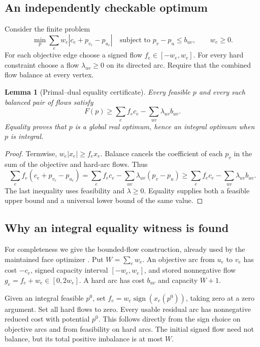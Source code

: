 \documentclass[11pt,letterpaper]{article}
\newtheorem{lemma}[theorem]{Lemma}
\theoremstyle{definition}
\begin{document}
\subsection{An independently checkable optimum}
Consider the finite problem
\begin{equation}\label{eq:networkprimal}
 \min_p\sum_e w_e|c_e+p_{v_e}-p_{u_e}|
 \quad\text{subject to }p_v-p_u\leq b_{uv},\qquad w_e\geq0.
\end{equation}
For each objective edge choose a signed flow $f_e\in[-w_e,w_e]$. For every hard constraint choose a flow $\lambda_{uv}\geq0$ on its directed arc. Require that the combined flow balance at every vertex.

\begin{lemma}[Primal--dual equality certificate]\label{lem:dual}
Every feasible $p$ and every such balanced pair of flows satisfy
\begin{equation}\label{eq:weakdual}
 F(p)\geq \sum_e f_ec_e-\sum_{uv}\lambda_{uv}b_{uv}.
\end{equation}
Equality proves that $p$ is a global real optimum, hence an integral optimum when $p$ is integral.
\end{lemma}
\begin{proof}
Termwise, $w_e|x_e|\geq f_ex_e$. Balance cancels the coefficient of each $p_v$ in the sum of the objective and hard-arc flows. Thus
\[
 \sum_e f_e(c_e+p_{v_e}-p_{u_e})
 =\sum_e f_ec_e-\sum_{uv}\lambda_{uv}(p_v-p_u)
 \geq\sum_e f_ec_e-\sum_{uv}\lambda_{uv}b_{uv}.
\]
The last inequality uses feasibility and $\lambda\geq0$. Equality supplies both a feasible upper bound and a universal lower bound of the same value.
\end{proof}

\subsection{Why an integral equality witness is found}
For completeness we give the bounded-flow construction, already used by the maintained face optimizer \cite{euler,flowcode}. Put $W=\sum_e w_e$. An objective arc from $u_e$ to $v_e$ has cost $-c_e$, signed capacity interval $[-w_e,w_e]$, and stored nonnegative flow $g_e=f_e+w_e\in[0,2w_e]$. A hard arc has cost $b_{uv}$ and capacity $W+1$.

Given an integral feasible $p^0$, set $f_e=w_e\operatorname{sign}(x_e(p^0))$, taking zero at a zero argument. Set all hard flows to zero. Every usable residual arc has nonnegative reduced cost with potential $p^0$. This follows directly from the sign choice on objective arcs and from feasibility on hard arcs. The initial signed flow need not balance, but its total positive imbalance is at most $W$.
\end{document}
